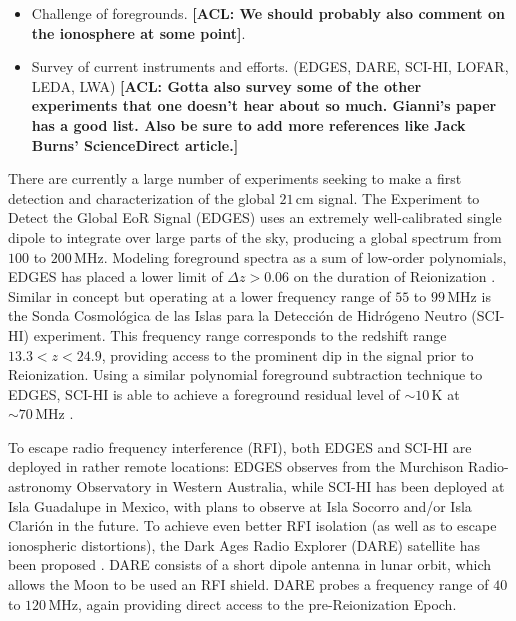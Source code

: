 \documentclass[twolcolumn,apj,iop,numberedappendix]{emulateapj}
\newcommand{\acl}[1]{{\color{red} \textbf{[ACL:  #1]}}}
\begin{document}
\begin{itemize}
\item Challenge of foregrounds.  \acl{We should probably also comment on the ionosphere at some point}.
\item Survey of current instruments and efforts. (EDGES, DARE, SCI-HI, LOFAR, LEDA, LWA) \acl{Gotta also survey some of the other experiments that one doesn't hear about so much.  Gianni's paper has a good list.  Also be sure to add more references like Jack Burns' ScienceDirect article.}
\end{itemize}
There are currently a large number of experiments seeking to make a first detection and characterization of the global $21\,\textrm{cm}$ signal.  The Experiment to Detect the Global EoR Signal (EDGES) uses an extremely well-calibrated single dipole \citep{rogersCalib} to integrate over large parts of the sky, producing a global spectrum from $100$ to $200\,\textrm{MHz}$.  Modeling foreground spectra as a sum of low-order polynomials, EDGES has placed a lower limit of $\Delta z > 0.06$ on the duration of Reionization \citep{bowmanRogersMeasurement}.  Similar in concept but operating at a lower frequency range of $55$ to $99\,\textrm{MHz}$ is the Sonda Cosmol\'{o}gica de las Islas para la Detecci\'{o}n de Hidr\'{o}geno Neutro (SCI-HI) experiment.  This frequency range corresponds to the redshift range $13.3 < z < 24.9$, providing access to the prominent dip in the signal prior to Reionization.  Using a similar polynomial foreground subtraction technique to EDGES, SCI-HI is able to achieve a foreground residual level of $\sim 10\,\textrm{K}$ at $\sim 70 \,\textrm{MHz}$ \citep{voytekSCIHI}.

To escape radio frequency interference (RFI), both EDGES and SCI-HI are deployed in rather remote locations: EDGES observes from the Murchison Radio-astronomy Observatory in Western Australia, while SCI-HI has been deployed at Isla Guadalupe in Mexico, with plans to observe at Isla Socorro and/or Isla Clari\'{o}n in the future.  To achieve even better RFI isolation (as well as to escape ionospheric distortions), the Dark Ages Radio Explorer (DARE) satellite has been proposed \citep{DAREMCMC}.  DARE consists of a short dipole antenna in lunar orbit, which allows the Moon to be used an RFI shield.  DARE probes a frequency range of $40$ to $120\,\textrm{MHz}$, again providing direct access to the pre-Reionization Epoch.
\end{document}
